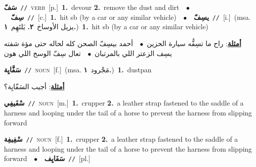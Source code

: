 \documentclass[10pt,a4paper,twoside]{article} %
\begin{document}
\begin{multicols}{2}
{\setlength\topsep{0pt}\textbf{\foreignlanguage{arabic}{سَفّ}}\ {\color{gray}\texttt{//}\color{black}}\ \textsc{verb}\ [p.]\ \textbf{1.}~devour  \textbf{2.}~remove the dust and dirt\ \ $\bullet$\ \ \setlength\topsep{0pt}\textbf{\foreignlanguage{arabic}{سِفّ}}\ {\color{gray}\texttt{//}\color{black}}\ [c.]\ \textbf{1.}~hit sb (by a car or any similar vehicle)\ \ $\bullet$\ \ \setlength\topsep{0pt}\textbf{\foreignlanguage{arabic}{يسِفّ}}\ {\color{gray}\texttt{//}\color{black}}\ [i.]\ \color{gray}(msa. \foreignlanguage{arabic}{يزيل الأوساخ}~\foreignlanguage{arabic}{\textbf{٢.}}  \foreignlanguage{arabic}{يَلتَهِم}~\foreignlanguage{arabic}{\textbf{١.}})\color{black}\ \textbf{1.}~hit sb (by a car or any similar vehicle)\  \begin{flushright}\color{gray}\foreignlanguage{arabic}{\textbf{\underline{\foreignlanguage{arabic}{أمثلة}}}: راح ما تسِفُّه سيارة الحزين\ $\bullet$\ \  أحمد بيسِفّ الصحن كله لحاله حتى مؤة شفته يسِف الزعتر اللي بالمرتبان\ $\bullet$\ \  تعال سِفّ الوسخ اللي هون}\end{flushright}\color{black}} \vspace{2mm}

{\setlength\topsep{0pt}\textbf{\foreignlanguage{arabic}{سَفَّايِة}}\ {\color{gray}\texttt{//}\color{black}}\ \textsc{noun}\ [f.]\ \color{gray}(msa. \foreignlanguage{arabic}{مَجْرود}~\foreignlanguage{arabic}{\textbf{١.}})\color{black}\ \textbf{1.}~dustpan\  \begin{flushright}\color{gray}\foreignlanguage{arabic}{\textbf{\underline{\foreignlanguage{arabic}{أمثلة}}}: أجيب السَفّايِة؟}\end{flushright}\color{black}} \vspace{2mm}

{\setlength\topsep{0pt}\textbf{\foreignlanguage{arabic}{سْفَيفِي}}\ {\color{gray}\texttt{//}\color{black}}\ \textsc{noun}\ [m.]\ \textbf{1.}~crupper  \textbf{2.}~a leather strap fastened to the saddle of a harness and looping under the tail of a horse to prevent the harness from slipping forward\ } \vspace{2mm}

{\setlength\topsep{0pt}\textbf{\foreignlanguage{arabic}{سْفِيفِة}}\ {\color{gray}\texttt{//}\color{black}}\ \textsc{noun}\ [f.]\ \textbf{1.}~crupper  \textbf{2.}~a leather strap fastened to the saddle of a harness and looping under the tail of a horse to prevent the harness from slipping forward\ \ $\bullet$\ \ \setlength\topsep{0pt}\textbf{\foreignlanguage{arabic}{سَفَايِف}}\ {\color{gray}\texttt{//}\color{black}}\ [pl.]\ } \vspace{2mm}


\end{multicols}
\end{document}
